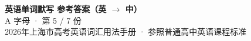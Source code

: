 \documentclass[10pt,a4paper]{article}
\begin{document}
\pagestyle{plain}

\begin{center}
{\LARGE\bfseries 英语单词默写 \quad 参考答案（英 $\to$ 中）}\\[0.22em]
{\large A 字母 · 第 5 / 7 份}\\[0.18em]
{\small 2026年上海市高考英语词汇用法手册 · 参照普通高中英语课程标准}
\end{center}

\vspace{0.2em}
\noindent{\color{rulegray}\rule{\textwidth}{0.8pt}}

\vspace{0.35em}

\vspace{0.25em}
\renewcommand{\arraystretch}{1.32}
\end{document}
